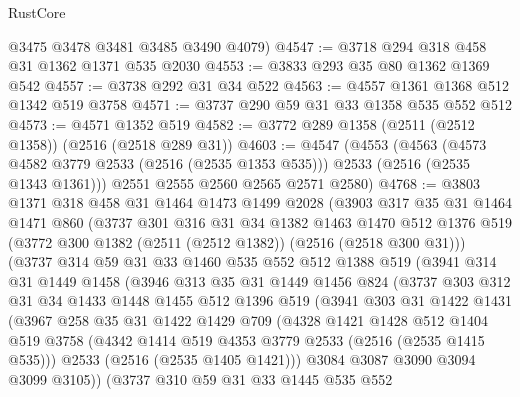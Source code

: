 \begin{lexlean}{RustCore}
\begin{coremodule}
      @3475
      @3478
      @3481
      @3485
      @3490
      @4079)
@4547 := @3718 @294 @318 @458 @31 @1362 @1371 @535 @2030
@4553 := @3833 @293 @35 @80 @1362 @1369 @542
@4557 := @3738 @292 @31 @34 @522
@4563 := @4557 @1361 @1368 @512 @1342 @519 @3758
@4571 := @3737 @290 @59 @31 @33 @1358 @535 @552 @512
@4573 := @4571 @1352 @519
@4582 := @3772 @289 @1358 (@2511 (@2512 @1358)) (@2516 (@2518 @289 @31))
@4603 := @4547
    (@4553
      (@4563 (@4573 @4582 @3779 @2533 (@2516 (@2535 @1353 @535))) @2533 (@2516 (@2535 @1343 @1361)))
      @2551
      @2555
      @2560
      @2565
      @2571
      @2580)
@4768 := @3803
    @1371
    @318
    @458
    @31
    @1464
    @1473
    @1499
    @2028
    (@3903
      @317
      @35
      @31
      @1464
      @1471
      @860
      (@3737
        @301
        @316
        @31
        @34
        @1382
        @1463
        @1470
        @512
        @1376
        @519
        (@3772 @300 @1382 (@2511 (@2512 @1382)) (@2516 (@2518 @300 @31)))
        (@3737
          @314
          @59
          @31
          @33
          @1460
          @535
          @552
          @512
          @1388
          @519
          (@3941
            @314
            @31
            @1449
            @1458
            (@3946
              @313
              @35
              @31
              @1449
              @1456
              @824
              (@3737
                @303
                @312
                @31
                @34
                @1433
                @1448
                @1455
                @512
                @1396
                @519
                (@3941
                  @303
                  @31
                  @1422
                  @1431
                  (@3967
                    @258
                    @35
                    @31
                    @1422
                    @1429
                    @709
                    (@4328
                      @1421
                      @1428
                      @512
                      @1404
                      @519
                      @3758
                      (@4342 @1414 @519 @4353 @3779 @2533 (@2516 (@2535 @1415 @535)))
                      @2533
                      (@2516 (@2535 @1405 @1421)))
                    @3084
                    @3087
                    @3090
                    @3094
                    @3099
                    @3105))
                (@3737
                  @310
                  @59
                  @31
                  @33
                  @1445
                  @535
                  @552

\end{coremodule}
\end{lexlean}
